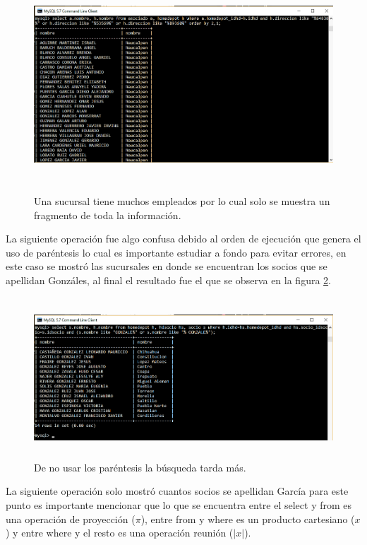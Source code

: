 \documentclass[12pt, titlepage]{article}
\begin{document}
 \begin{figure}[H]
	\begin{center}
		\includegraphics[width=16cm, height=8cm]{img/comando5.png}
		\caption{Una sucursal tiene muchos empleados por lo cual solo se muestra un fragmento de toda la información.}
		\label{fig:comando5}
	\end{center}
\end{figure}
La siguiente operación fue algo confusa debido al orden de ejecución que genera el uso de paréntesis lo cual es importante estudiar a fondo para evitar errores, en este caso se mostró las sucursales en donde se encuentran los socios que se apellidan Gonzáles, al final el resultado fue el que se observa en la figura \ref{fig:comando6}.
 \begin{figure}[H]
	\begin{center}
		\includegraphics[width=15cm, height=6cm]{img/comando6.png}
		\caption{De no usar los paréntesis la búsqueda tarda más.}
		\label{fig:comando6}
	\end{center}
\end{figure}
La siguiente operación solo mostró cuantos socios se apellidan García para este punto es importante mencionar que lo que se encuentra entre el select y from es una operación de proyección ($\pi$), entre from y where es un producto cartesiano ($x$) y entre where y el resto es una operación reunión ($|x|$).
\end{document}
